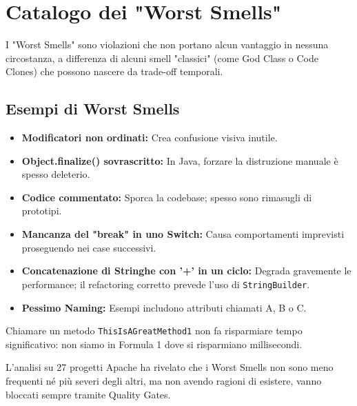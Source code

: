 \section{Catalogo dei "Worst Smells"}
I "Worst Smells" sono violazioni che non portano alcun vantaggio in nessuna circostanza, a differenza di alcuni smell "classici" (come God Class o Code Clones) che possono nascere da trade-off temporali.

\subsection{Esempi di Worst Smells}
\begin{itemize}
    \item \textbf{Modificatori non ordinati:} Crea confusione visiva inutile.
    \item \textbf{Object.finalize() sovrascritto:} In Java, forzare la distruzione manuale è spesso deleterio.
    \item \textbf{Codice commentato:} Sporca la codebase; spesso sono rimasugli di prototipi.
    \item \textbf{Mancanza del "break" in uno Switch:} Causa comportamenti imprevisti proseguendo nei case successivi.
    \item \textbf{Concatenazione di Stringhe con '+' in un ciclo:} Degrada gravemente le performance; il refactoring corretto prevede l'uso di \texttt{StringBuilder}.
    \item \textbf{Pessimo Naming:} Esempi includono attributi chiamati A, B o C.
\end{itemize}

\begin{notaprof}
Chiamare un metodo \texttt{ThisIsAGreatMethod1} non fa risparmiare tempo significativo: non siamo in Formula 1 dove si risparmiano millisecondi.
\end{notaprof}

\begin{notaslide}
L'analisi su 27 progetti Apache ha rivelato che i Worst Smells non sono meno frequenti né più severi degli altri, ma non avendo ragioni di esistere, vanno bloccati sempre tramite Quality Gates.
\end{notaslide}




